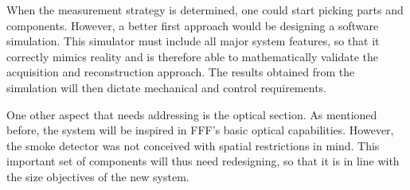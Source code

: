 When the measurement strategy is determined, one could start picking
parts and components. However, a better first approach would be
designing a software simulation. This simulator must include all major
system features, so that it correctly mimics reality and is therefore
able to mathematically validate the acquisition and reconstruction
approach. The results obtained from the simulation will then dictate
mechanical and control requirements.

One other aspect that needs addressing is the optical section. As
mentioned before, the system will be inspired in \gls{FFF}'s basic
optical capabilities. However, the smoke detector was not conceived with
spatial restrictions in mind. This important set of components will thus
need redesigning, so that it is in line with the size objectives of the
new system.
